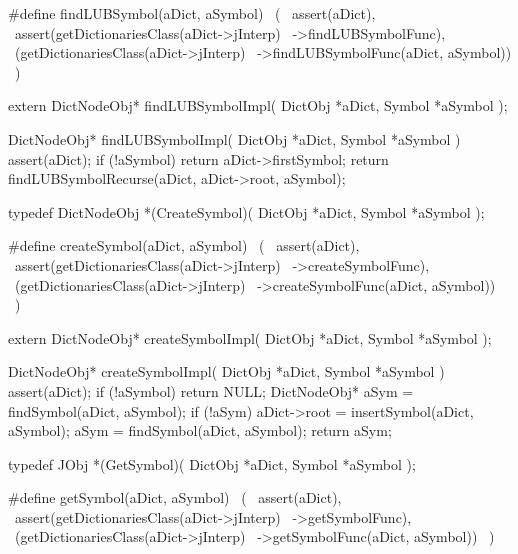 #define findLUBSymbol(aDict, aSymbol)           \
  (                                             \
    assert(aDict),                              \
    assert(getDictionariesClass(aDict->jInterp) \
      ->findLUBSymbolFunc),                     \
    (getDictionariesClass(aDict->jInterp)       \
      ->findLUBSymbolFunc(aDict, aSymbol))      \
  )
\stopCHeader

\setCHeaderStream{private}
\startCHeader
extern DictNodeObj* findLUBSymbolImpl(
  DictObj *aDict,
  Symbol  *aSymbol
);
\stopCHeader
\setCHeaderStream{public}

\startCCode
DictNodeObj* findLUBSymbolImpl(
  DictObj *aDict,
  Symbol  *aSymbol
) {
  assert(aDict);
  if (!aSymbol) return aDict->firstSymbol;
  return findLUBSymbolRecurse(aDict, aDict->root, aSymbol);
}
\stopCCode
\stopTestSuite

\startTestSuite[createSymbol]

\startCHeader
typedef DictNodeObj *(CreateSymbol)(
  DictObj *aDict,
  Symbol  *aSymbol
);

#define createSymbol(aDict, aSymbol)            \
  (                                             \
    assert(aDict),                              \
    assert(getDictionariesClass(aDict->jInterp) \
      ->createSymbolFunc),                      \
    (getDictionariesClass(aDict->jInterp)       \
      ->createSymbolFunc(aDict, aSymbol))       \
  )
\stopCHeader

\startCHeader
extern DictNodeObj* createSymbolImpl(
  DictObj *aDict,
  Symbol  *aSymbol
);
\stopCHeader
\setCHeaderStream{public}

\startCCode
DictNodeObj* createSymbolImpl(
  DictObj *aDict,
  Symbol  *aSymbol
) {
  assert(aDict);
  if (!aSymbol) return NULL;
  DictNodeObj* aSym = findSymbol(aDict, aSymbol);
  if (!aSym) {
    aDict->root = insertSymbol(aDict, aSymbol);
    aSym = findSymbol(aDict, aSymbol);
  }
  return aSym;
}
\stopCCode
\stopTestSuite

\startTestSuite[getSymbol]

\startCHeader
typedef JObj *(GetSymbol)(
  DictObj *aDict,
  Symbol  *aSymbol
);

#define getSymbol(aDict, aSymbol)               \
  (                                             \
    assert(aDict),                              \
    assert(getDictionariesClass(aDict->jInterp) \
      ->getSymbolFunc),                         \
    (getDictionariesClass(aDict->jInterp)       \
      ->getSymbolFunc(aDict, aSymbol))          \
  )
\stopCHeader

